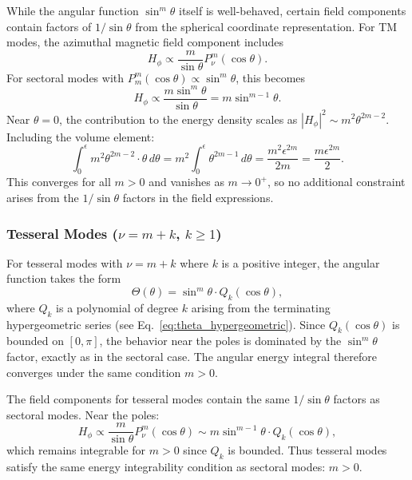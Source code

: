 \documentclass[
  aip,
  amsmath,amssymb,
  preprint
]{revtex4-1}
\begin{document}
While the angular function $\sin^m\theta$ itself is well-behaved, certain field components contain factors of $1/\sin\theta$ from the spherical coordinate representation. For TM modes, the azimuthal magnetic field component includes
\begin{equation}
H_\phi \propto \frac{m}{\sin\theta} P_\nu^m(\cos\theta).
\label{eq:H_phi_factor}
\end{equation}
For sectoral modes with $P_m^m(\cos\theta) \propto \sin^m\theta$, this becomes
\begin{equation}
H_\phi \propto \frac{m \sin^m\theta}{\sin\theta} = m \sin^{m-1}\theta.
\label{eq:H_phi_sectoral}
\end{equation}
Near $\theta = 0$, the contribution to the energy density scales as $|H_\phi|^2 \sim m^2 \theta^{2m-2}$. Including the volume element:
\begin{equation}
\int_0^\epsilon m^2 \theta^{2m-2} \cdot \theta \, d\theta = m^2 \int_0^\epsilon \theta^{2m-1} \, d\theta = \frac{m^2 \epsilon^{2m}}{2m} = \frac{m \epsilon^{2m}}{2}.
\label{eq:H_phi_energy}
\end{equation}
This converges for all $m > 0$ and vanishes as $m \to 0^+$, so no additional constraint arises from the $1/\sin\theta$ factors in the field expressions.

\subsubsection{Tesseral Modes ($\nu = m + k$, $k \geq 1$)}
For tesseral modes with $\nu = m + k$ where $k$ is a positive integer, the angular function takes the form
\begin{equation}
\Theta(\theta) = \sin^m\theta \cdot Q_k(\cos\theta),
\label{eq:angular_tesseral}
\end{equation}
where $Q_k$ is a polynomial of degree $k$ arising from the terminating hypergeometric series (see Eq.~\eqref{eq:theta_hypergeometric}). Since $Q_k(\cos\theta)$ is bounded on $[0, \pi]$, the behavior near the poles is dominated by the $\sin^m\theta$ factor, exactly as in the sectoral case. The angular energy integral therefore converges under the same condition $m > 0$.

The field components for tesseral modes contain the same $1/\sin\theta$ factors as sectoral modes. Near the poles:
\begin{equation}
H_\phi \propto \frac{m}{\sin\theta} P_\nu^m(\cos\theta) \sim m \sin^{m-1}\theta \cdot Q_k(\cos\theta),
\end{equation}
which remains integrable for $m > 0$ since $Q_k$ is bounded. Thus tesseral modes satisfy the same energy integrability condition as sectoral modes: $m > 0$.
\end{document}
